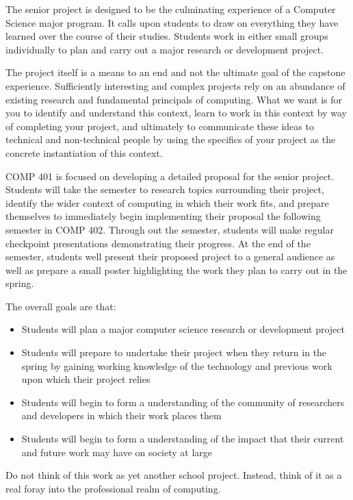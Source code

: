 \documentclass[10pt]{article}
\begin{document}
The senior project is designed to be the culminating experience of a Computer Science major program.  It calls upon students to draw on everything they have learned over the course of their studies. Students work in either small groups individually to plan and carry out a major research or development project.  

The project itself is a means to an end and not the ultimate goal of the capstone experience. Sufficiently interesting and complex projects rely on an abundance of existing research and fundamental principals of computing.  What we want is for you to identify and understand this context, learn to work in this context by way of completing your project, and ultimately to communicate these ideas to technical and non-technical people by using the specifics of your project as the concrete instantiation of this context. 
 
COMP 401 is focused on developing a detailed proposal for the senior project. Students will take the semester to research topics surrounding their project, identify the wider context of computing in which their work fits, and prepare themselves to immediately begin implementing their proposal the following semester in COMP 402.  Through out the semester, students will make regular checkpoint presentations demonstrating their progress.  At the end of the semester, students well present their proposed project to a general audience as well as prepare a small poster highlighting the work they plan to carry out in the spring. 

The overall goals are that:
\begin{itemize}
\item Students will plan a major computer science research or development project
\item Students will prepare to undertake their project when they return in the spring by gaining working knowledge of the technology and previous work upon which their project relies
\item Students will begin to form a understanding of the community of researchers and developers in which their work places them
\item Students will begin to form a understanding of the impact that their current and future work may  have on society at large 
\end{itemize}

Do not think of this work as yet another school project. Instead, think of it as a real foray into the professional realm of computing. 
\end{document}
